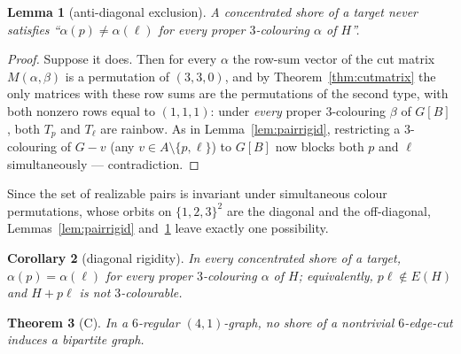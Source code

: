 \documentclass[11pt]{article}
\newtheorem{theorem}{Theorem}[section]
\newtheorem{lemma}[theorem]{Lemma}
\newtheorem{corollary}[theorem]{Corollary}
\theoremstyle{remark}
\begin{document}
\begin{lemma}[anti-diagonal exclusion]\label{lem:antidiag}
A concentrated shore of a target never satisfies
``$\alpha(p)\ne\alpha(\ell)$ for every proper $3$-colouring $\alpha$ of $H$''.
\end{lemma}

\begin{proof}
Suppose it does. Then for every $\alpha$ the row-sum vector of the cut matrix
$M(\alpha,\beta)$ is a permutation of $(3,3,0)$, and by
Theorem~\ref{thm:cutmatrix} the only matrices with these row sums are the
permutations of the second type, with both nonzero rows equal to $(1,1,1)$:
under \emph{every} proper $3$-colouring $\beta$ of $G[B]$, both $T_p$ and
$T_\ell$ are rainbow. As in Lemma~\ref{lem:pairrigid}, restricting a
$3$-colouring of $G-v$ (any $v\in A\setminus\{p,\ell\}$) to $G[B]$ now blocks
both $p$ and $\ell$ simultaneously --- contradiction.
\end{proof}

Since the set of realizable pairs is invariant under simultaneous colour
permutations, whose orbits on $\{1,2,3\}^2$ are the diagonal and the
off-diagonal, Lemmas~\ref{lem:pairrigid} and~\ref{lem:antidiag} leave exactly
one possibility.

\begin{corollary}[diagonal rigidity]\label{cor:diag}
In every concentrated shore of a target, $\alpha(p)=\alpha(\ell)$ for
\emph{every} proper $3$-colouring $\alpha$ of $H$; equivalently, $p\ell\notin
E(H)$ and $H+p\ell$ is not $3$-colourable.
\end{corollary}

\begin{theorem}[C]\label{thm:C}
In a $6$-regular $(4,1)$-graph, no shore of a nontrivial $6$-edge-cut induces a
bipartite graph.
\end{theorem}
\end{document}
